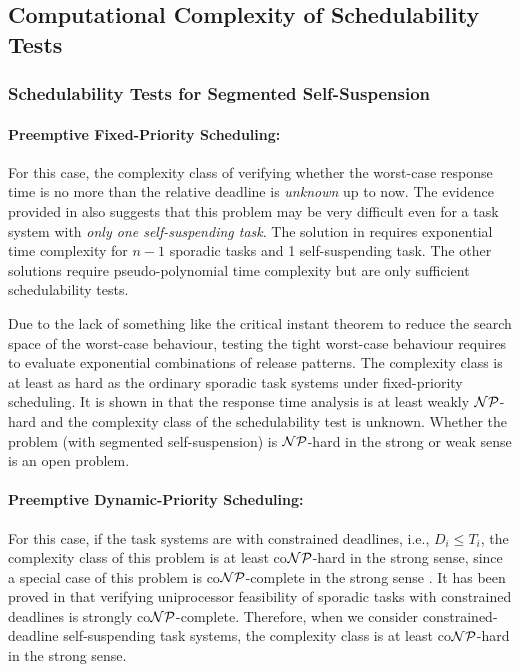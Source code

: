 \subsection{Computational Complexity of Schedulability Tests}

\subsubsection{Schedulability Tests for Segmented Self-Suspension}
\paragraph{Preemptive Fixed-Priority Scheduling:}   
For this case, the complexity class of verifying whether the worst-case response time is no more than the relative deadline is \emph{unknown} up to now. The evidence provided in \cite{ecrts15nelissen} also suggests that this problem may be very difficult even for a task system with \emph{only one self-suspending task}. The solution in \cite{ecrts15nelissen}  requires exponential time complexity for $n-1$ sporadic tasks and 1 self-suspending task. The other solutions \cite{Huang:multiseg}\cite{PH:rtss98} require pseudo-polynomial time complexity but are only sufficient schedulability tests.

Due to 
the lack of something like the critical instant theorem to reduce the search space of the worst-case behaviour, testing the tight worst-case behaviour requires to evaluate exponential combinations of release patterns. The complexity class is at least as hard as the ordinary sporadic task systems under fixed-priority scheduling. It is shown in \cite{EisenbrandR08} that the response time analysis is at least weakly ${\cal NP}$-hard and the complexity class of the schedulability test is unknown.
Whether the problem (with segmented self-suspension) is ${\cal NP}$-hard in the strong or weak sense is an open problem.

\paragraph{Preemptive Dynamic-Priority Scheduling:} 
For this case, if the task systems are with constrained deadlines, i.e., $D_i \leq T_i$, the complexity class of this problem is at least co${\cal NP}$-hard in the strong sense, since a special case of this problem is co${\cal NP}$-complete in the strong sense \cite{DBLP:conf/ecrts/Ekberg015}. It has been proved in \cite{DBLP:conf/ecrts/Ekberg015} that verifying uniprocessor feasibility of sporadic tasks with constrained deadlines is strongly co${\cal NP}$-complete.  Therefore, when we consider constrained-deadline self-suspending task systems, the complexity class is at least co${\cal NP}$-hard in the strong sense.


